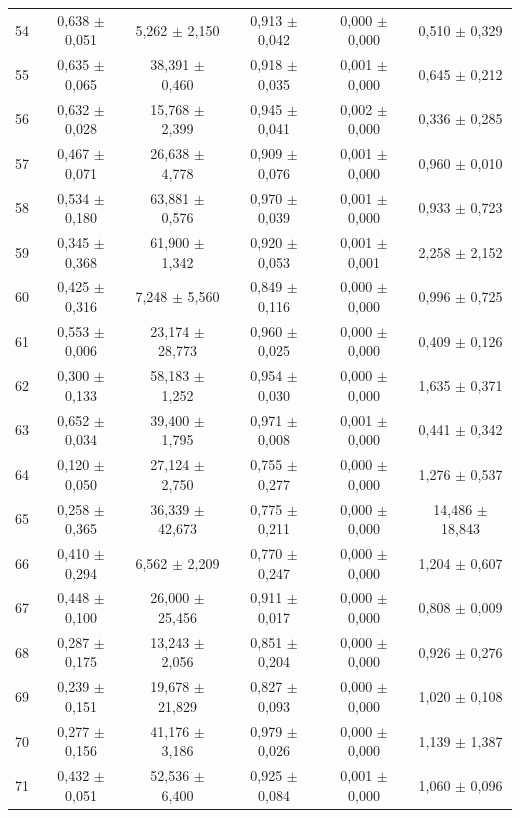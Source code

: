 \begin{tabular}{l c c c c c}
54 & 0,638 $\pm$ 0,051 & 5,262 $\pm$ 2,150 & 0,913 $\pm$ 0,042 & 0,000 $\pm$ 0,000 & 0,510 $\pm$ 0,329 \\
55 & 0,635 $\pm$ 0,065 & 38,391 $\pm$ 0,460 & 0,918 $\pm$ 0,035 & 0,001 $\pm$ 0,000 & 0,645 $\pm$ 0,212 \\
56 & 0,632 $\pm$ 0,028 & 15,768 $\pm$ 2,399 & 0,945 $\pm$ 0,041 & 0,002 $\pm$ 0,000 & 0,336 $\pm$ 0,285 \\
57 & 0,467 $\pm$ 0,071 & 26,638 $\pm$ 4,778 & 0,909 $\pm$ 0,076 & 0,001 $\pm$ 0,000 & 0,960 $\pm$ 0,010 \\
58 & 0,534 $\pm$ 0,180 & 63,881 $\pm$ 0,576 & 0,970 $\pm$ 0,039 & 0,001 $\pm$ 0,000 & 0,933 $\pm$ 0,723 \\
59 & 0,345 $\pm$ 0,368 & 61,900 $\pm$ 1,342 & 0,920 $\pm$ 0,053 & 0,001 $\pm$ 0,001 & 2,258 $\pm$ 2,152 \\
60 & 0,425 $\pm$ 0,316 & 7,248 $\pm$ 5,560 & 0,849 $\pm$ 0,116 & 0,000 $\pm$ 0,000 & 0,996 $\pm$ 0,725 \\
61 & 0,553 $\pm$ 0,006 & 23,174 $\pm$ 28,773 & 0,960 $\pm$ 0,025 & 0,000 $\pm$ 0,000 & 0,409 $\pm$ 0,126 \\
62 & 0,300 $\pm$ 0,133 & 58,183 $\pm$ 1,252 & 0,954 $\pm$ 0,030 & 0,000 $\pm$ 0,000 & 1,635 $\pm$ 0,371 \\
63 & 0,652 $\pm$ 0,034 & 39,400 $\pm$ 1,795 & 0,971 $\pm$ 0,008 & 0,001 $\pm$ 0,000 & 0,441 $\pm$ 0,342 \\
64 & 0,120 $\pm$ 0,050 & 27,124 $\pm$ 2,750 & 0,755 $\pm$ 0,277 & 0,000 $\pm$ 0,000 & 1,276 $\pm$ 0,537 \\
65 & 0,258 $\pm$ 0,365 & 36,339 $\pm$ 42,673 & 0,775 $\pm$ 0,211 & 0,000 $\pm$ 0,000 & 14,486 $\pm$ 18,843 \\
66 & 0,410 $\pm$ 0,294 & 6,562 $\pm$ 2,209 & 0,770 $\pm$ 0,247 & 0,000 $\pm$ 0,000 & 1,204 $\pm$ 0,607 \\
67 & 0,448 $\pm$ 0,100 & 26,000 $\pm$ 25,456 & 0,911 $\pm$ 0,017 & 0,000 $\pm$ 0,000 & 0,808 $\pm$ 0,009 \\
68 & 0,287 $\pm$ 0,175 & 13,243 $\pm$ 2,056 & 0,851 $\pm$ 0,204 & 0,000 $\pm$ 0,000 & 0,926 $\pm$ 0,276 \\
69 & 0,239 $\pm$ 0,151 & 19,678 $\pm$ 21,829 & 0,827 $\pm$ 0,093 & 0,000 $\pm$ 0,000 & 1,020 $\pm$ 0,108 \\
70 & 0,277 $\pm$ 0,156 & 41,176 $\pm$ 3,186 & 0,979 $\pm$ 0,026 & 0,000 $\pm$ 0,000 & 1,139 $\pm$ 1,387 \\
71 & 0,432 $\pm$ 0,051 & 52,536 $\pm$ 6,400 & 0,925 $\pm$ 0,084 & 0,001 $\pm$ 0,000 & 1,060 $\pm$ 0,096 \\

\end{tabular}
